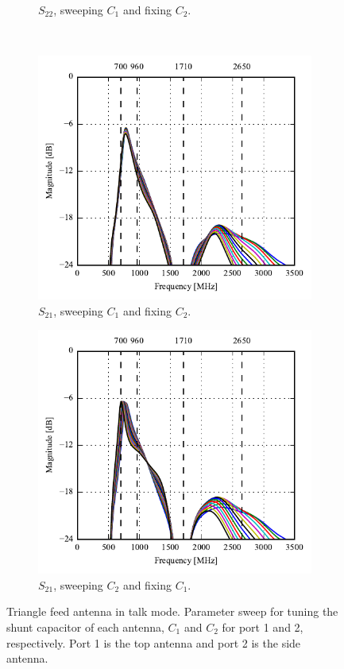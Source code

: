 \begin{figure}[htbp]
\begin{subfigure}[b]{0.49\linewidth}
        \caption{$S_{22}$, sweeping $C_1$ and fixing $C_2$.}
    \end{subfigure}
    \\
    \begin{subfigure}[b]{0.49\linewidth}
        \centering
        \includegraphics{img/tech_sol/trianglefeed/talk_mode/Csh1s21.pdf}
        \caption{$S_{21}$, sweeping $C_1$ and fixing $C_2$.}
    \end{subfigure}
    \hfill
    \begin{subfigure}[b]{0.49\linewidth}
        \centering
        \includegraphics{img/tech_sol/trianglefeed/talk_mode/Csh2s21.pdf}
        \caption{$S_{21}$, sweeping $C_2$ and fixing $C_1$.}
    \end{subfigure}
    \caption{Triangle feed antenna in talk mode. Parameter sweep for tuning the shunt capacitor of each antenna, $C_1$ and $C_2$ for port 1 and 2, respectively. Port 1 is the top antenna and port 2 is the side antenna.}
    \label{fig:tiang_sparam_sweep_talk}
\end{figure}

